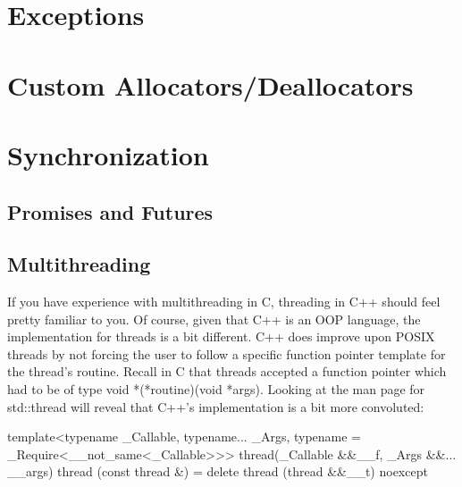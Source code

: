 \documentclass{article}
\begin{document}
\section{Exceptions}

\section{Custom Allocators/Deallocators}

\section{Synchronization}

\subsection{Promises and Futures}

\subsection{Multithreading}

If you have experience with multithreading in C, threading in C++ should feel pretty familiar to you. Of
course, given that C++ is an OOP language, the implementation for threads is a bit different. C++ does
improve upon POSIX threads by not forcing the user to follow a specific function pointer template for the
thread's routine. Recall in C that threads accepted a function pointer which had to be of type
void *(*routine)(void *args). Looking at the man page for std::thread will reveal that C++'s implementation
is a bit more convoluted:

\begin{cpplst}

template<typename _Callable, typename... _Args, typename = _Require<__not_same<_Callable>>>
thread(_Callable &&__f, _Args &&... __args)
thread (const thread &) = delete
thread (thread &&__t) noexcept

\end{cpplst}
\end{document}
